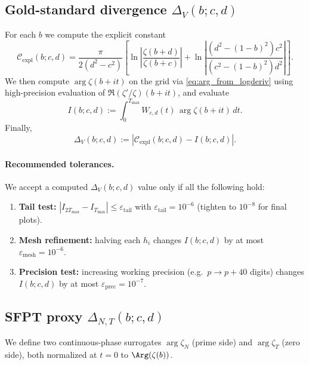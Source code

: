 \documentclass[11pt]{article}
\theoremstyle{definition}
\begin{document}
\subsection{Gold-standard divergence \(\Delta_V(b;c,d)\)}\label{subsec:deltaV}
For each \(b\) we compute the explicit constant
\begin{equation}\label{eq:Cexpl_numeric}
\mathcal{C}_{\mathrm{expl}}(b;c,d)
=
\frac{\pi}{2(d^2-c^2)}
\left[
\ln\left|\frac{\zeta(b+d)}{\zeta(b+c)}\right|
+
\ln\left|\frac{(d^2-(1-b)^2)c^2}{(c^2-(1-b)^2)d^2}\right|
\right].
\end{equation}
We then compute \(\arg\zeta(b+it)\) on the grid via \eqref{eq:arg_from_logderiv} using
high-precision evaluation of \(\Re(\zeta'/\zeta)(b+it)\), and evaluate
\begin{equation}\label{eq:Ibcd}
I(b;c,d):=\int_{0}^{T_{\max}} W_{c,d}(t)\,\arg\zeta(b+it)\,dt.
\end{equation}
Finally,
\begin{equation}\label{eq:DeltaV_num}
\Delta_V(b;c,d):=\left|\mathcal{C}_{\mathrm{expl}}(b;c,d)-I(b;c,d)\right|.
\end{equation}

\paragraph{Recommended tolerances.}
We accept a computed \(\Delta_V(b;c,d)\) value only if all the following hold:
\begin{enumerate}
\item \textbf{Tail test:} \(|I_{2T_{\max}}-I_{T_{\max}}|\le \varepsilon_{\mathrm{tail}}\) with
\(\varepsilon_{\mathrm{tail}}=10^{-6}\) (tighten to \(10^{-8}\) for final plots).
\item \textbf{Mesh refinement:} halving each \(h_i\) changes \(I(b;c,d)\) by at most
\(\varepsilon_{\mathrm{mesh}}=10^{-6}\).
\item \textbf{Precision test:} increasing working precision (e.g.\ \(p\to p+40\) digits) changes
\(I(b;c,d)\) by at most \(\varepsilon_{\mathrm{prec}}=10^{-7}\).
\end{enumerate}

\subsection{SFPT proxy \(\Delta_{N,T}(b;c,d)\)}\label{subsec:deltaNT}
We define two continuous-phase surrogates \(\arg\zeta_N\) (prime side) and \(\arg\zeta_T\) (zero side),
both normalized at \(t=0\) to \(\Arg(\zeta(b))\).
\end{document}
